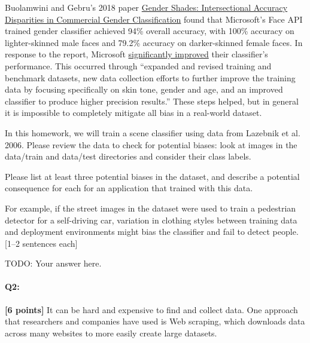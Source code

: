 Buolamwini and Gebru's 2018 paper \href{http://proceedings.mlr.press/v81/buolamwini18a/buolamwini18a.pdf}{Gender Shades: Intersectional Accuracy Disparities in Commercial Gender Classification} found that Microsoft's Face API trained gender classifier achieved 94\% overall accuracy, with 100\% accuracy on lighter-skinned male faces and 79.2\% accuracy on darker-skinned female faces. In response to the report, Microsoft \href{https://blogs.microsoft.com/ai/gender-skin-tone-facial-recognition-improvement/}{significantly improved} their classifier's performance. This occurred through ``expanded and revised training and benchmark datasets, new data collection efforts to further improve the training data by focusing specifically on skin tone, gender and age, and an improved classifier to produce higher precision results.'' These steps helped, but in general it is impossible to completely mitigate all bias in a real-world dataset. 

In this homework, we will train a scene classifier using data from Lazebnik et al. 2006. Please review the data to check for potential biases: look at images in the data/train and data/test directories and consider their class labels. 

Please list at least three potential biases in the dataset, and describe a potential consequence for each for an application that trained with this data.

For example, if the street images in the dataset were used to train a pedestrian detector for a self-driving car, variation in clothing styles between training data and deployment environments might bias the classifier and fail to detect people. [1--2 sentences each]


\begin{mdframed}
TODO: Your answer here.
\end{mdframed}



\pagebreak
 
\paragraph{Q2:} \textbf{[6 points]} It can be hard and expensive to find and collect data. One approach that researchers and companies have used is Web scraping, which downloads data across many websites to more easily create large datasets.

